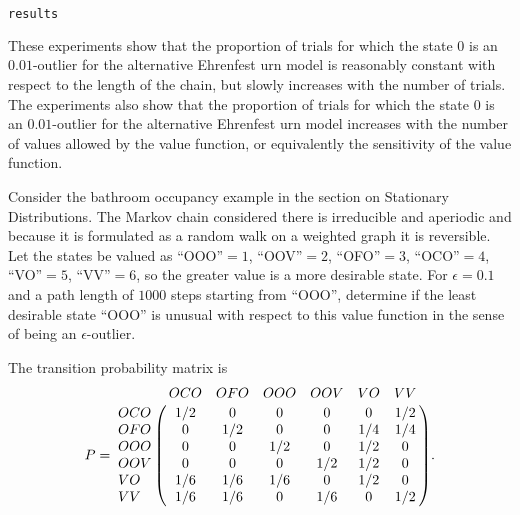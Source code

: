 \documentclass[12pt]{article}
\begin{document}
\begin{solution}
\begin{lstlisting}[language=R]
results
\end{lstlisting}

\begin{description}
\item[\( N= 7 \)\
\begin{verbatim*}
        [,1]   [,2]    [,3]     [,4]
[1,] 0.430 0.3975 0.38875 0.407500
[2,] 0.475 0.4800 0.48125 0.488125
[3,] 0.555 0.5675 0.52500 0.530000
[4,] 0.545 0.5900 0.59750 0.577500
\end{verbatim*}
\item[\( N = 21 \)]
\begin{verbatim*}
      [,1]   [,2]    [,3]     [,4]
[1,] 0.730 0.7250 0.75250 0.740625
[2,] 0.875 0.9200 0.92625 0.920000
[3,] 0.985 0.9825 0.98625 0.975000
[4,] 1.000 1.0000 1.00000 0.999375
\end{verbatim*}
\item[\( N = 51 \)]
\begin{verbatim*}
      [,1]   [,2]    [,3]     [,4]
[1,] 0.775 0.7425 0.73500 0.734375
[2,] 0.930 0.9275 0.94125 0.935625
[3,] 0.980 0.9850 0.98375 0.979375
[4,] 0.995 0.9975 0.99875 1.000000
\end{verbatim*}
\end{description}
\end{solution}

These experiments show that
the proportion of trials for which the
    state \( 0 \) is an \( 0.01 \)-outlier for the alternative Ehrenfest
    urn model is reasonably constant with respect to the length of the
    chain, but slowly increases with the number of trials.  The
    experiments also show that
the proportion of trials for which the
    state \( 0 \) is an \( 0.01 \)-outlier for the alternative Ehrenfest
    urn model increases with the number of values allowed by the value
    function, or equivalently the sensitivity of the value function.  

\begin{exercise}
Consider the bathroom occupancy example in the section on Stationary
Distributions.  The Markov chain considered there is irreducible and
aperiodic and because it is formulated as a random walk on a weighted
graph it is reversible.  Let the states be valued as ``OOO''$=1$,
``OOV''$=2$, ``OFO''$=3$, ``OCO''$=4$, ``VO''$=5$, ``VV''$=6$, so the greater
value is a more desirable state.  For $\epsilon=0.1$ and a path
length of $1000$ steps starting from ``OOO'', determine if the least
desirable state ``OOO'' is unusual with respect to this value function
in the sense of being an $\epsilon$-outlier.

The transition probability matrix is
\[
    P= \bordermatrix{ & OCO & OFO & OOO & OOV & VO & VV \cr
    OCO & 1/2 & 0 & 0 & 0 & 0 & 1/2 \cr
    OFO & 0 & 1/2 & 0 & 0 & 1/4 & 1/4 \cr
    OOO & 0 & 0 & 1/2 & 0 & 1/2 & 0 \cr
    OOV & 0 & 0 & 0 & 1/2 & 1/2 & 0 \cr
    VO & 1/6 & 1/6 & 1/6 & 0 & 1/2 & 0 \cr
    VV & 1/6 & 1/6 & 0 & 1/6 & 0 & 1/2 \cr
    }.
\]
\end{exercise}
\end{document}
